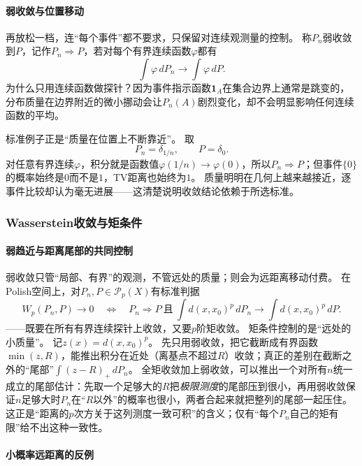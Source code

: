 \paragraph{弱收敛与位置移动}

再放松一档，连“每个事件”都不要求，只保留对连续观测量的控制。
称$P_n$弱收敛到$P$，记作$P_n\Rightarrow P$，若对每个有界连续函数$\varphi$都有
\[
 \int\varphi\,dP_n\to\int\varphi\,dP.
\]
为什么只用连续函数做探针？因为事件指示函数$\mathbf 1_A$在集合边界上通常是跳变的，分布质量在边界附近的微小挪动会让$P_n(A)$剧烈变化，却不会明显影响任何连续函数的平均。

标准例子正是“质量在位置上不断靠近”。
取
\[
 P_n=\delta_{1/n},\qquad P=\delta_0.
\]
对任意有界连续$\varphi$，积分就是函数值$\varphi(1/n)\to\varphi(0)$，所以$P_n\Rightarrow P$；但事件$\{0\}$的概率始终是$0$而不是$1$，TV距离也始终为$1$。
质量明明在几何上越来越接近，逐事件比较却认为毫无进展——这清楚说明收敛结论依赖于所选标准。

\subsubsection{Wasserstein收敛与矩条件}

\paragraph{弱趋近与距离尾部的共同控制}

弱收敛只管“局部、有界”的观测，不管远处的质量；则会为远距离移动付费。
在Polish空间上，对$P_n,P\in\mathcal P_p(X)$有标准判据
\begin{equation}
 W_p(P_n,P)\to0
 \quad\Longleftrightarrow\quad
 P_n\Rightarrow P
 \ \text{且}\
 \int d(x,x_0)^p\,dP_n\to\int d(x,x_0)^p\,dP.
 \label{eq:measure-wasserstein-criterion}
\end{equation}
——既要在所有有界连续探针上收敛，又要$p$阶矩收敛。
矩条件控制的是“远处的小质量”。
记$z(x)=d(x,x_0)^p$。
先只用弱收敛，把它截断成有界函数$\min(z,R)$，能推出积分在近处（离基点不超过$R$）收敛；真正的差别在截断之外的“尾部”$\int(z-R)_+\,dP_n$。
全矩收敛加上弱收敛，可以推出一个对所有$n$统一成立的尾部估计：先取一个足够大的$R$把\emph{极限测度}的尾部压到很小，再用弱收敛保证$n$足够大时$P_n$在“$R$以外”的概率也很小，两者合起来就把整列的尾部一起压住。
这正是“距离的$p$次方关于这列测度一致可积”的含义；仅有“每个$P_n$自己的矩有限”给不出这种一致性。

\paragraph{小概率远距离的反例}

